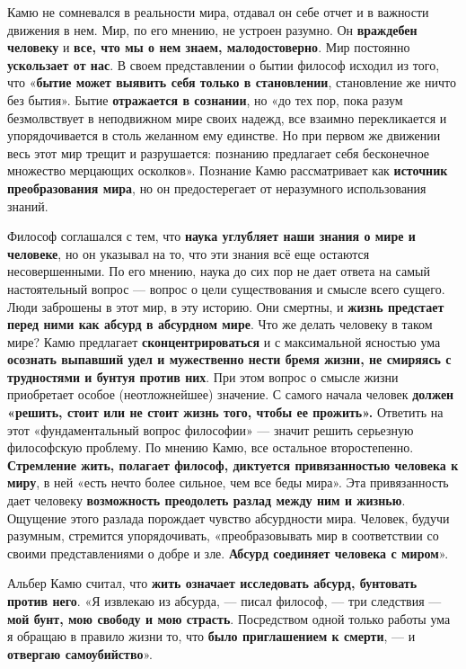 \documentclass{article}
\begin{document}
\begin{flushleft}

Камю не сомневался в реальности мира, отдавал он себе отчет и в важности движения в нем. Мир, по его мнению, не устроен разумно. Он \textbf{враждебен человеку} и \textbf{все, что мы о нем знаем, малодостоверно}. Мир постоянно \textbf{ускользает от нас}. В своем представлении о бытии философ исходил из того, что «\textbf{бытие может выявить себя только в становлении}, становление же ничто без бытия». Бытие \textbf{отражается в сознании}, но «до тех пор, пока разум безмолвствует в неподвижном мире своих надежд, все взаимно перекликается и упорядочивается в столь желанном ему единстве. Но при первом же движении весь этот мир трещит и разрушается: познанию предлагает себя бесконечное множество мерцающих осколков». Познание Камю рассматривает как \textbf{источник преобразования мира}, но он предостерегает от неразумного использования знаний.

\hfill

Философ соглашался с тем, что \textbf{наука углубляет наши знания о мире и человеке}, но он указывал на то, что эти знания всё еще остаются несовершенными. По его мнению, наука до сих пор не дает ответа на самый настоятельный вопрос — вопрос о цели существования и смысле всего сущего. Люди заброшены в этот мир, в эту историю. Они смертны, и \textbf{жизнь предстает перед ними как абсурд в абсурдном мире}. Что же делать человеку в таком мире? Камю предлагает \textbf{сконцентрироваться} и с максимальной ясностью ума \textbf{осознать выпавший удел и мужественно нести бремя жизни, не смиряясь с трудностями и бунтуя против них}. При этом вопрос о смысле жизни приобретает особое (неотложнейшее) значение. С самого начала человек \textbf{должен «решить, стоит или не стоит жизнь того, чтобы ее прожить».} Ответить на этот «фундаментальный вопрос философии» — значит решить серьезную философскую проблему. По мнению Камю, все остальное второстепенно. \textbf{Стремление жить, полагает философ, диктуется привязанностью человека к миру}, в ней «есть нечто более сильное, чем все беды мира». Эта привязанность дает человеку \textbf{возможность преодолеть разлад между ним и жизнью}. Ощущение этого разлада порождает чувство абсурдности мира. Человек, будучи разумным, стремится упорядочивать, «преобразовывать мир в соответствии со своими представлениями о добре и зле. \textbf{Абсурд соединяет человека с миром}».

\hfill

Альбер Камю считал, что \textbf{жить означает исследовать абсурд, бунтовать против него}. «Я извлекаю из абсурда, — писал философ, — три следствия — \textbf{мой бунт, мою свободу и мою страсть}. Посредством одной только работы ума я обращаю в правило жизни то, что \textbf{было приглашением к смерти}, — и \textbf{отвергаю самоубийство}».


\end{flushleft}
\end{document}
